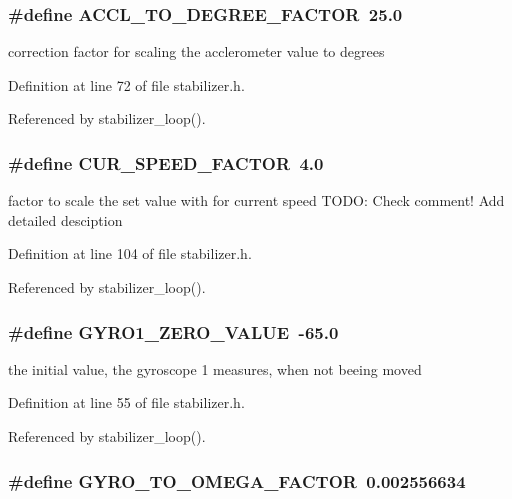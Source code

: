 \subsubsection{\setlength{\rightskip}{0pt plus 5cm}\#define ACCL\_\-TO\_\-DEGREE\_\-FACTOR~25.0}\label{stabilizer_8h_64d51047e317d0d7da457f60bcd47028}


correction factor for scaling the acclerometer value to degrees 

Definition at line 72 of file stabilizer.h.

Referenced by stabilizer\_\-loop().
\subsubsection{\setlength{\rightskip}{0pt plus 5cm}\#define CUR\_\-SPEED\_\-FACTOR~4.0}\label{stabilizer_8h_a4a6a13b91688973362edab491ec5801}


factor to scale the set value with for current speed TODO: Check comment! Add detailed desciption 

Definition at line 104 of file stabilizer.h.

Referenced by stabilizer\_\-loop().
\subsubsection{\setlength{\rightskip}{0pt plus 5cm}\#define GYRO1\_\-ZERO\_\-VALUE~-65.0}\label{stabilizer_8h_23edd713eb04c1f7b66eec97a198adb0}


the initial value, the gyroscope 1 measures, when not beeing moved 

Definition at line 55 of file stabilizer.h.

Referenced by stabilizer\_\-loop().
\subsubsection{\setlength{\rightskip}{0pt plus 5cm}\#define GYRO\_\-TO\_\-OMEGA\_\-FACTOR~0.002556634}\label{stabilizer_8h_2963d2e1ade8f16b08002541372d0ed2}


